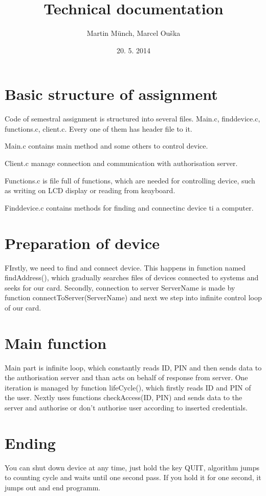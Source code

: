 \documentclass[a4paper,12pt]{article}
\title{Technical documentation}
\author{Martin Münch, Marcel Ouška}
\date{20. 5. 2014}
\begin{document}
\maketitle

\section{Basic structure of assignment}

Code of semestral assignment is structured into several files. Main.c, finddevice.c, functions.c, client.c. Every one of them has header file to it.

Main.c contains main method and some others to control device. 

Client.c manage connection and communication with authorisation server. 

Functions.c is file full of functions, which are needed for controlling device, such as writing on LCD display or reading from keayboard.

Finddevice.c contains methods for finding and connectinc device ti a computer.


\section{Preparation of device}

FIrstly, we need to find and connect device. This happens in function named findAddress(), which gradually searches files of devices connected to systems and seeks for our card. Secondly, connection to server ServerName is made by function connectToServer(ServerName) and next we step into infinite control loop of our card.

\section{Main function}

Main part is infinite loop, which constantly reads ID, PIN and then sends data to the authorisation server and than acts on behalf of response from server. One iteration is managed by function lifeCycle(), which firstly reads ID and PIN of the user. Nextly uses functions checkAccess(ID, PIN) and sends data to the server and authorise or don't authorise user according to inserted credentials.

\section{Ending}

You can shut down device at any time, just hold the key QUIT, algorithm jumps to counting cycle and waits until one second pass. If you hold it for one second, it jumps out and end programm.
\end{document}
